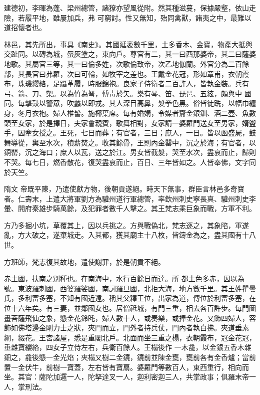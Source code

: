 \begin{pinyinscope}
 建德初，李暉為蓬、梁州總管，諸獠亦望風從附。然其種滋蔓，保據嚴壑，依山走險，若履平地，雖屢加兵，弗
 可窮討。性又無知，殆同禽獸，諸夷之中，最難以道招懷者也。



 林邑，其先所出，事具《南史》。其國延袤數千里，土多香木、金寶，物產大抵與交趾同。以磚為城，蜃灰塗之，東向戶。尊官有二，其一曰西那婆帝，其二曰薩婆地歌。其屬官三等，其一曰倫多姓，次歌倫致帝，次乙地伽蘭。外官分為二百餘部，其長官曰弗羅，次曰可輪，如牧宰之差也。王戴金花冠，形如章甫，衣朝霞布，珠璣纓絡，足躡革履，時服錦袍。良家子侍衛者二百許人，皆執金裝。兵有弓、箭、刀、槊。以為竹為弩，傅毒於矢。樂有琴、笛、琵琶、五絃，頗與中
 國同。每擊鼓以警眾，吹蠡以即戎。其人深目高鼻，髮拳色黑。俗皆徒跣，以幅巾纏身，冬月衣袍。婦人椎髻。施椰葉席。每有婚媾，令媒者齎金銀釧、酒二壺、魚數頭至女家，於是擇日，夫家會親賓，歌舞相對，女家請一婆羅門送女至男家，婿盥手，因牽女授之。王死，七日而葬；有官者，三日；庶人，一日。皆以函盛屍，鼓舞導從，輿至水次，積薪焚之。收其餘骨，王則內金罌中，沉之於海；有官者，以銅罌，沉之海口；庶人以瓦，送之於江。男女皆截髮，哭至水次，盡哀而止，歸則不哭。每七日，燃香散花，復哭盡哀而止，百日、三年皆如之。人皆奉佛，文字同於天竺。



 隋文
 帝既平陳，乃遣使獻方物，後朝貢遂絕。時天下無事，群臣言林邑多奇寶者。仁壽末，上遣大將軍劉方為驩州道行軍總管，率欽州刺史寧長真、驩州刺史李暈、開府秦雄步騎萬餘，及犯罪者數千人擊之。其王梵志乘巨象而戰，方軍不利。



 方乃多掘小坑，草覆其上，因以兵挑之。方與戰偽北，梵志逐之，其象陷，軍遂亂，方大破之，遂棄城走。入其都，獲其廟主十八枚，皆鑄金為之，盡其國有十八世。



 方班師，梵志復其故地，遣使謝罪，於是朝貢不絕。



 赤土國，扶南之別種也。在南海中，水行百餘日而達。所
 都土色多赤，因以為號。東波羅刺國，西婆羅娑國，南訶羅旦國，北拒大海，地方數千里。其王姓瞿曇氏，多利富多塞，不知有國近遠。稱其父釋王位，出家為道，傳位於利富多塞，在位十六年矣。有三妻，並鄰國女也。居僧祗城，有門三重，相去各百許步。每門圖畫菩薩飛仙之象，懸金花鈴眊，婦人數十人，或奏樂，或捧金花。又飾四婦人，容飾如佛塔邊金剛力士之狀，夾門而立，門外者持兵仗，門內者執白拂。夾道垂素網，綴花。王宮諸屋，悉是重閣北戶。北面而坐三重之榻，衣朝霞布，冠金花冠，垂雜寶纓絡，四女子立侍左右，兵衛百餘人。王榻後作
 一木龕，以金銀五香木雜鈿之，龕後懸一金光焰；夾榻又樹二金鏡，鏡前並陳金甕，甕前各有金香爐；當前置一金伏牛，前樹一寶蓋，左右皆有寶扇。婆羅門等數百人，東西重行，相向而坐。其官：薩陀加邏一人，陀拏達叉一人，迦利密迦三人，共掌政事；俱羅末帝一人，掌刑法。




\end{pinyinscope}
